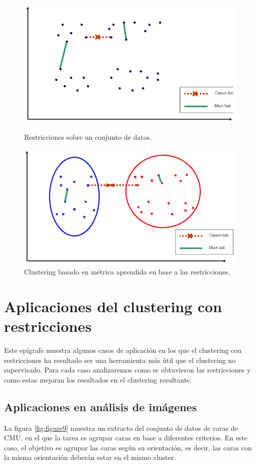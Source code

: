 \begin{figure}[bth]
	\myfloatalign
	{\includegraphics[width=.6\linewidth]{imagenes/c3/InputInstancesAndConst2}
	\caption{Restricciones sobre un conjunto de datos. \cite{Survey:2007}} \label{fig:figure7}
	}
	{\includegraphics[width=.6\linewidth]{imagenes/c3/MetricaAprendida}
	\caption{Clustering basado en métrica aprendida en base a las restricciones. \cite{Survey:2007}} \label{fig:figure8}
	}
\end{figure}

\section{Aplicaciones del clustering con restricciones} 

Este epígrafe muestra algunos casos de aplicación en los que el clustering con restricciones ha resultado ser una herramienta más útil que el clustering no supervisado. Para cada caso analizaremos como se obtuvieron las restricciones y como estas mejoran los resultados en el clustering resultante. 

\subsection{Aplicaciones en análisis de imágenes}

La figura \ref{fig:figure9} muestra un extracto del conjunto de datos de caras de  \acf{CMU}, en el que la tarea es agrupar caras en base a diferentes criterios. En este caso, el objetivo es agrupar las caras según su orientación, es decir, las caras con la misma orientación deberán estar en el mismo cluster.

